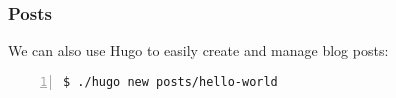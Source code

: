 \begin{frame}[fragile]
    \frametitle{Posts}

    We can also use Hugo to easily create and manage blog posts:

    \medskip

    \begin{lstlisting}[style=saneCode,gobble=8,numbers=left]
      $ ./hugo new posts/hello-world
    \end{lstlisting}
\end{frame}